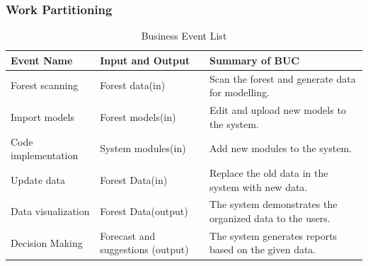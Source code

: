 \documentclass{article}
\begin{document}
\subsubsection{Work Partitioning}
\begin{table}[H]
\caption{Business Event List} 
\begin{tabularx}{\textwidth}{XXX}
\toprule
\textbf{Event Name} & \textbf{Input and Output} & \textbf{Summary of BUC}\\
\midrule
Forest scanning & Forest data(in) & Scan the forest and generate data for modelling.\\
Import models & Forest models(in) & Edit and upload new models to the system.\\
Code implementation & System modules(in) & Add new modules to the system.\\
Update data & Forest Data(in) & Replace the old data in the system with new data.\\
Data visualization & Forest Data(output) & The system demonstrates the organized data to the users.\\
Decision Making & Forecast and suggestions (output) & The system generates reports based on the given data.\\
\bottomrule
\end{tabularx}
\end{table}

\newpage
\end{document}
